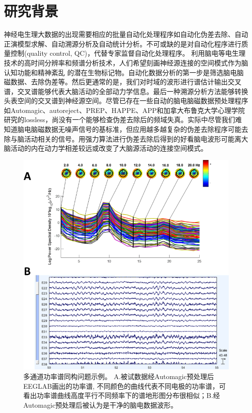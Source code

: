\section{研究背景}
神经电生理大数据的出现需要相应的批量自动化处理程序如自动化伪差去除、自动正演模型求解、自动溯源分析及自动统计分析。不可或缺的是对自动化程序进行质量控制(quality control, QC)，代替专家监督自动化处理程序。 利用脑电等电生理技术的高时间分辨率和频谱分析技术，人们希望刻画神经源连接的空间模式作为脑认知功能和精神紊乱
的潜在生物标记物。自动化数据分析的第一步是筛选脑电脑磁数据、去除伪差等。然后更通常的是，我们对时域的波形进行谱估计输出交叉谱，交叉谱能够代表大脑活动的全部动力学信息。最后一种溯源分析方法能够转换头表空间的交叉谱到神经源空间。尽管已存在一些自动的脑电脑磁数据预处理程序如Automagic、autoreject、PREP、HAPPE、APP和加拿大布鲁克大学心理学院研究的lossless，尚没有一个能够检查伪差去除后的频域失真。实际中尽管我们难知道脑电脑磁数据无噪声信号的基标准，但应用越多越复杂的伪差去除程序可能去除与脑活动相关的信号。用强力算法进行伪差去除后得到的好看脑电波形可能离大脑活动的内在动力学相差较远或改变了大脑源活动的连接空间模式。
\begin{figure}[!h]
\includegraphics[width=15cm]{pic/palos/issue.png}
\caption{多通道功率谱同构问题示例。 A.被试数据经Automagic预处理后EEGLAB画出的功率谱, 不同颜色的曲线代表不同电极的功率谱，可看出功率谱曲线高度平行不同频率下的谱地形图分布很相似；B.经Automagic预处理后被认为是干净的脑电数据波形。}
\label{issue}
\end{figure}

